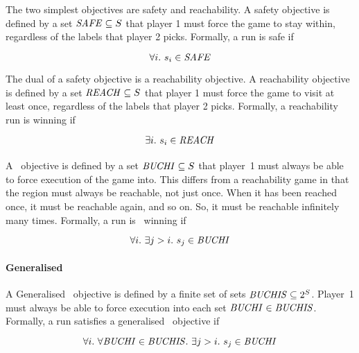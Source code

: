 The two simplest objectives are safety and reachability. A safety objective is defined by a set $\mathit{SAFE} \subseteq S$ that player 1 must force the game to stay within, regardless of the labels that player 2 picks. Formally, a run is safe if 

\begin{equation}
\label{eqn:safeobj}
\forall i.\ s_i \in \mathit{SAFE}
\end{equation}

The dual of a safety objective is a reachability objective. A reachability objective is defined by a set $\mathit{REACH} \subseteq S$ that player 1 must force the game to visit at least once, regardless of the labels that player 2 picks. Formally, a reachability run is winning if 

\begin{equation}
\label{eqn:reachobj}
\exists i.\ s_i \in \mathit{REACH}
\end{equation}

\paragraph{\buchi}
A \buchi\ objective is defined by a set $\mathit{BUCHI} \subseteq S$ that player~1 must always be able to force execution of the game into. This differs from a reachability game in that the region must always be reachable, not just once. When it has been reached once, it must be reachable again, and so on. So, it must be reachable infinitely many times. Formally, a run is \buchi\ winning if 

\begin{equation}
\forall i.\ \exists j>i.\ s_j \in \mathit{BUCHI}
\end{equation}

\paragraph{Generalised \buchi}
A Generalised \buchi\ objective is defined by a finite set of sets $\mathit{BUCHIS} \subseteq 2^S$. Player~1 must always be able to force execution into each set $\mathit{BUCHI} \in \mathit{BUCHIS}$. Formally, a run satisfies a generalised \buchi\ objective if 

\begin{equation}
\forall i.\ \forall \mathit{BUCHI} \in \mathit{BUCHIS}.\ \exists j>i.\ s_j \in \mathit{BUCHI}
\end{equation}

